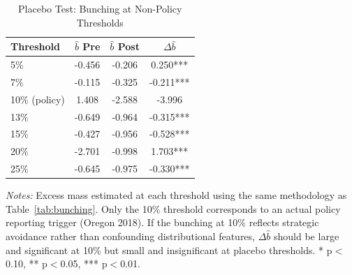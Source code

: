 \begin{table}[H]
\centering
\caption{Placebo Test: Bunching at Non-Policy Thresholds}
\begin{threeparttable}
\begin{tabular}{lccc}
\toprule
Threshold & $\hat{b}$ Pre & $\hat{b}$ Post & $\Delta\hat{b}$ \\
\midrule
5\% & -0.456 & -0.206 & 0.250*** \\
7\% & -0.115 & -0.325 & -0.211*** \\
10\% (policy) & 1.408 & -2.588 & -3.996 \\
13\% & -0.649 & -0.964 & -0.315*** \\
15\% & -0.427 & -0.956 & -0.528*** \\
20\% & -2.701 & -0.998 & 1.703*** \\
25\% & -0.645 & -0.975 & -0.330*** \\
\bottomrule
\end{tabular}
\begin{tablenotes}[flushleft]
\small
\item \textit{Notes:} Excess mass estimated at each threshold using the same methodology as Table~\ref{tab:bunching}. Only the 10\% threshold corresponds to an actual policy reporting trigger (Oregon 2018). If the bunching at 10\% reflects strategic avoidance rather than confounding distributional features, $\Delta\hat{b}$ should be large and significant at 10\% but small and insignificant at placebo thresholds. * p$<$0.10, ** p$<$0.05, *** p$<$0.01.
\end{tablenotes}
\end{threeparttable}
\label{tab:placebo}
\end{table}
